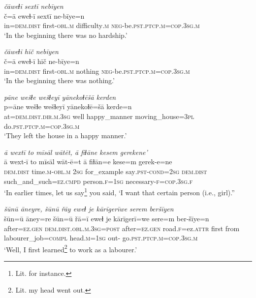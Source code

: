 \ea \label{ŽE.56}
\textit{čāweɫī sextī nebīyen} \\ 
\gll č=ā eweɫ-ī sextī ne-bīye=n \\ 
 in=\textsc{dem.dist} first\textsc{-obl}\textsc{.m} difficulty\textsc{.m} \textsc{neg-}be\textsc{.pst}\textsc{.ptcp}\textsc{.m}\textsc{=cop}\textsc{.3sg}\textsc{.m} \\ 
\glt `In the beginning there was no hardship.'
\z 
 
\ea \label{ŽE.57}
\textit{čāweɫī hīč nebīyen} \\ 
\gll č=ā eweɫ-ī hīč ne-bīye=n \\ 
 in=\textsc{dem.dist} first\textsc{-obl}\textsc{.m} nothing \textsc{neg-}be\textsc{.pst}\textsc{.ptcp}\textsc{.m}\textsc{=cop}\textsc{.3sg}\textsc{.m} \\ 
\glt `In the beginning there was nothing.'
\z 
 
\ea \label{ŽE.71}
\textit{pāne wešɫe wešɫeyī yānekoɫēšā kerden} \\ 
\gll p=āne wešɫe wešɫeyī yānekoɫē=šā kerde=n \\ 
 at=\textsc{dem.dist}\textsc{.dir}\textsc{.m}\textsc{.3sg} well happy\_manner moving\_house\textsc{=3pl} do\textsc{.pst}\textsc{.ptcp}\textsc{.m}\textsc{=cop}\textsc{.3sg}\textsc{.m} \\ 
\glt `They left the house in a happy manner.'
\z 
 
\ea \label{ŽE.73}
\textit{ā wextī to mīsāl wātēt, ā fiɫāne kesem gerekene’} \\ 
\gll ā wext-ī to mīsāl wāt-ē=t ā fiɫān=e kese=m gerek-e=ne \\ 
 \textsc{dem.dist} time\textsc{.m}\textsc{-obl}\textsc{.m} \textsc{2sg} for\_example say\textsc{.pst}\textsc{-cond}\textsc{=\textsc{2sg}} \textsc{dem.dist} such\_and\_such\textsc{=ez}\textsc{.cmpd} person\textsc{.f}\textsc{=\textsc{1sg}} necessary\textsc{-f}\textsc{=cop}\textsc{.3sg}\textsc{.f} \\ 
\glt `In earlier times, let us say\footnote{Lit. for instance.} you said, ‘I want that certain person (i.e., girl).''
\z 
 
\ea \label{ŽM.4}
\textit{šūnū āneyre, šūnū řāy eweɫ je kārīgerīwe serem beršīyen} \\ 
\gll šūn=ū āney=re šūn=ū řā=ī eweɫ je kārīgerī=we sere=m ber-šīye=n \\ 
 after\textsc{=ez.gen} \textsc{dem.dist}\textsc{.obl}\textsc{.m}\textsc{.3sg}\textsc{=\textsc{post}} after\textsc{=ez.gen} road\textsc{.f}=ez.\textsc{attr} first from labourer\_job\textsc{=compl} head\textsc{.m}\textsc{=\textsc{1sg}} out- go\textsc{.pst}\textsc{.ptcp}\textsc{.m}\textsc{=cop}\textsc{.3sg}\textsc{.m} \\ 
\glt `Well, I first learned\footnote{Lit. my head went out.}  to work as a labourer.'
\z 
 
